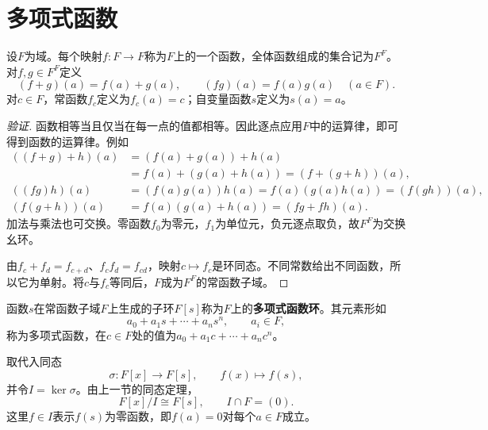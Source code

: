 \section{多项式函数}

\begin{definition}
设$F$为域。每个映射$f:F\to F$称为$F$上的一个函数，全体函数组成的集合记为$F^F$。对$f,g\in F^F$定义
\[
(f+g)(a)=f(a)+g(a),\qquad(fg)(a)=f(a)g(a)\quad(a\in F).
\]
对$c\in F$，常函数$f_c$定义为$f_c(a)=c$；自变量函数$s$定义为$s(a)=a$。
\end{definition}
\begin{proof}[验证]
函数相等当且仅当在每一点的值都相等。因此逐点应用$F$中的运算律，即可得到函数的运算律。例如
\begin{align*}
((f+g)+h)(a)&=(f(a)+g(a))+h(a)\\
&=f(a)+(g(a)+h(a))=(f+(g+h))(a),\\
((fg)h)(a)&=(f(a)g(a))h(a)=f(a)(g(a)h(a))=(f(gh))(a),\\
(f(g+h))(a)&=f(a)(g(a)+h(a))=(fg+fh)(a).
\end{align*}
加法与乘法也可交换。零函数$f_0$为零元，$f_1$为单位元，负元逐点取负，故$F^F$为交换幺环。

由$f_c+f_d=f_{c+d}$、$f_cf_d=f_{cd}$，映射$c\mapsto f_c$是环同态。不同常数给出不同函数，所以它为单射。将$c$与$f_c$等同后，$F$成为$F^F$的常函数子域。
\end{proof}

\begin{definition}
函数$s$在常函数子域$F$上生成的子环$F[s]$称为$F$上的\textbf{多项式函数环}。其元素形如
\[
a_0+a_1s+\cdots+a_ns^n,\qquad a_i\in F,
\]
称为多项式函数，在$c\in F$处的值为$a_0+a_1c+\cdots+a_nc^n$。
\end{definition}

取代入同态
\[
\sigma:F[x]\to F[s],\qquad f(x)\mapsto f(s),
\]
并令$I=\ker\sigma$。由上一节的同态定理，
\[
F[x]/I\cong F[s],\qquad I\cap F=(0).
\]
这里$f\in I$表示$f(s)$为零函数，即$f(a)=0$对每个$a\in F$成立。


